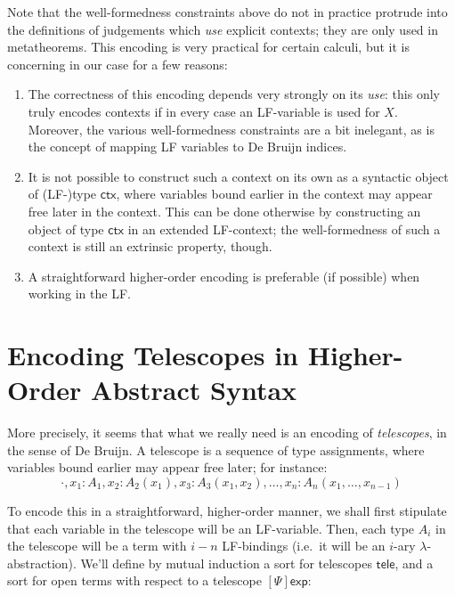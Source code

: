\documentclass[acmtoplas]{acmtrans2m}
\newcommand\sortexp{\mathsf{exp}}
\newcommand\sortctx{\mathsf{ctx}}
\newcommand\sorttele{\mathsf{tele}}
\newcommand\sortoexp[1]{[#1]\sortexp}
\begin{document}
Note that the well-formedness constraints above do not in practice protrude
into the definitions of judgements which \emph{use} explicit contexts; they are
only used in metatheorems. This encoding is very practical for certain calculi,
but it is concerning in our case for a few reasons:

\begin{enumerate}

  \item The correctness of this encoding depends very strongly on its
    \emph{use}: this only truly encodes contexts if in every case an LF-variable
    is used for $X$.  Moreover, the various well-formedness constraints are a
    bit inelegant, as is the concept of mapping LF variables to De Bruijn indices.

  \item It is not possible to construct such a context on its own as a
    syntactic object of (LF-)type $\sortctx$, where variables bound earlier in
    the context may appear free later in the context. This can be done
    otherwise by constructing an object of type $\sortctx$ in an extended
    LF-context; the well-formedness of such a context is still an extrinsic
    property, though.

  \item A straightforward higher-order encoding is preferable (if possible)
    when working in the LF.

\end{enumerate}

\section{Encoding Telescopes in Higher-Order Abstract Syntax}
More precisely, it seems that what we really need is an encoding of
\emph{telescopes}, in the sense of De Bruijn. A telescope is a
sequence of type assignments, where variables bound earlier may appear free
later; for instance:
\[
  \cdot,x_1:A_1, x_2:A_2(x_1), x_3:A_3(x_1,x_2), \dots, x_n:A_n(x_1,\dots,x_{n-1})
\]

To encode this in a straightforward, higher-order manner, we shall first
stipulate that each variable in the telescope will be an LF-variable. Then,
each type $A_i$ in the telescope will be a term with $i-n$ LF-bindings (i.e.\ it
will be an $i$-ary $\lambda$-abstraction). We'll define by mutual induction a
sort for telescopes $\sorttele$, and a sort for open terms with respect to a
telescope $\sortoexp{\Psi}$:
\end{document}
